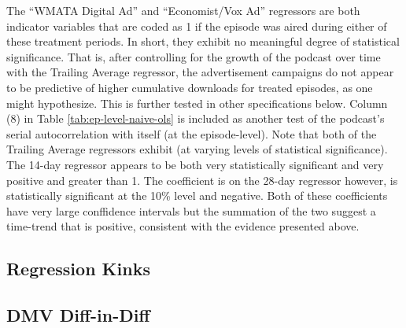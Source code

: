 \documentclass[11pt, letterpaper, twoside]{article}
\begin{document}
The ``WMATA Digital Ad'' and ``Economist/Vox Ad'' regressors are both indicator variables that are coded as 1 if the episode was aired during either of these treatment periods. In short, they exhibit no meaningful degree of statistical significance. That is, after controlling for the growth of the podcast over time with the Trailing Average regressor, the advertisement campaigns do not appear to be predictive of higher cumulative downloads for treated episodes, as one might hypothesize. This is further tested in other specifications below. Column (8) in Table \ref{tab:ep-level-naive-ols} is included as another test of the podcast's serial autocorrelation with itself (at the episode-level). Note that both of the Trailing Average regressors exhibit (at varying levels of statistical significance). The 14-day regressor appears to be both very statistically significant and very positive and greater than 1. The coefficient is on the 28-day regressor however, is statistically significant at the 10\% level and negative. Both of these coefficients have very large conffidence intervals but the summation of the two suggest a time-trend that is positive, consistent with the evidence presented above.

\subsection{Regression Kinks}


\subsection{DMV Diff-in-Diff}
\end{document}
